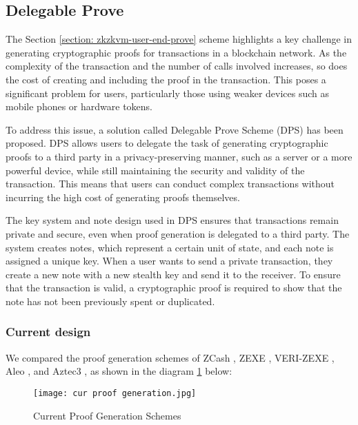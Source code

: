 \subsection{Delegable Prove}\label{section: zkzkvm-delegable-prove}

The Section \ref{section: zkzkvm-user-end-prove} scheme highlights a key challenge in generating cryptographic proofs for transactions in a blockchain network. As the complexity of the transaction and the number of calls involved increases, so does the cost of creating and including the proof in the transaction. This poses a significant problem for users, particularly those using weaker devices such as mobile phones or hardware tokens.

To address this issue, a solution called Delegable Prove Scheme (DPS) has been proposed. DPS allows users to delegate the task of generating cryptographic proofs to a third party in a privacy-preserving manner, such as a server or a more powerful device, while still maintaining the security and validity of the transaction. This means that users can conduct complex transactions without incurring the high cost of generating proofs themselves.

The key system and note design used in DPS ensures that transactions remain private and secure, even when proof generation is delegated to a third party. The system creates notes, which represent a certain unit of state, and each note is assigned a unique key. When a user wants to send a private transaction, they create a new note with a new stealth key and send it to the receiver. To ensure that the transaction is valid, a cryptographic proof is required to show that the note has not been previously spent or duplicated.

\subsubsection{Current design}

We compared the proof generation schemes of ZCash \cite{website:zcash-nu5}, ZEXE \cite{cryptoeprint:2018/962}, VERI-ZEXE \cite{cryptoeprint:2022/802}, Aleo \cite{website:aleo-vm}, and Aztec3 \cite{website:aztec3}, as shown in the diagram \ref{fig:cur_proof_generation} below:
\begin{figure}[!ht]
    \centering
    \texttt{[image: cur proof generation.jpg]}
    \caption{Current Proof Generation Schemes}
    \label{fig:cur_proof_generation}
\end{figure}

